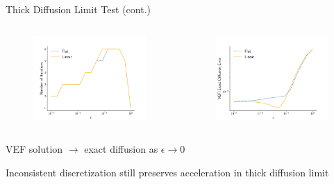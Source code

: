 \documentclass[10pt]{beamer}
\begin{document}
\begin{frame}{Thick Diffusion Limit Test (cont.)}

	\begin{columns}
	\begin{column}{.5\textwidth}
		\begin{figure}[htb]
			\centering
			\includegraphics[width=1.05\textwidth]{figs/dl_it.pdf}
			\label{fig:dl_it}
		\end{figure}
	\end{column}
	\begin{column}{.5\textwidth}
		\begin{figure}
			\centering
			\includegraphics[width=1.05\textwidth]{figs/dl_err.pdf}
			\label{fig:dl_err}
		\end{figure}
	\end{column}
	\end{columns}

	\pause
	VEF solution $\rightarrow$ exact diffusion as $\epsilon \rightarrow 0$

	\pause 
	Inconsistent discretization still preserves acceleration in thick diffusion limit 


\end{frame}
\end{document}
